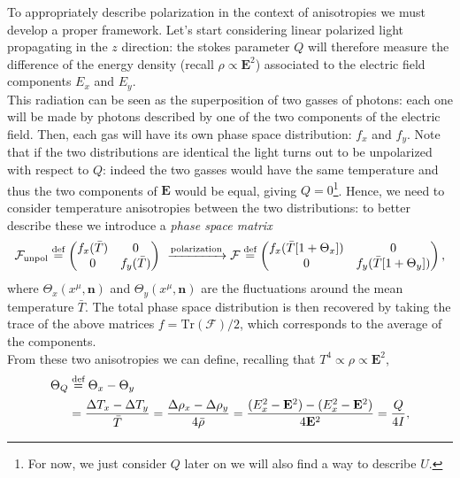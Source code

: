To appropriately describe polarization in the context of anisotropies we must develop a proper framework. Let's start considering linear polarized light propagating in the $z$ direction: the stokes parameter $Q$ will therefore measure the difference of the energy density (recall $\rho\propto \mathbf{E}^2$) associated to the electric field components $E_x$ and $E_y$.\\ This radiation can be seen as the superposition of two gasses of photons: each one will be made by photons described by one of the two components of the electric field. Then, each gas will have its own phase space distribution: $f_x$ and $f_y$. Note that if the two distributions are identical the light turns out to be unpolarized with respect to $Q$: indeed the two gasses would have the same temperature and thus the two components of $\mathbf{E}$ would be equal, giving $Q=0$\footnote{For now, we just consider $Q$ later on we will also find a way to describe $U$.}. Hence, we need to consider temperature anisotropies between the two distributions: to better describe these we introduce a \emph{phase space matrix}
\begin{equation}
    \label{eq:Pol_Occup_Matrix}
    \mathcal{F} _\text{unpol} \stackrel{\text{def}}{=}
    \begin{pmatrix}
        f_x(\bar T) & 0 \\ 0 & f_y(\bar T)
    \end{pmatrix}\ \xrightarrow{\text{polarization}}\mathcal{F}  \stackrel{\text{def}}{=}
    \begin{pmatrix}
        f_x(\bar T[1+\Theta_x]) & 0 \\ 0 & f_y(\bar T[1+\Theta_y ])
    \end{pmatrix},
\end{equation}
where $\Theta_x(x^\mu,\mathbf n)$ and $\Theta_y(x^\mu,\mathbf n)$ are the fluctuations around the mean temperature $\bar T$. The total phase space distribution is then recovered by taking the trace of the above matrices $f=\text{Tr}(\mathcal{F} )/2$, which corresponds to the average of the components.\\
From these two anisotropies we can define, recalling that $T^4\propto\rho\propto\mathbf{E}^2$,
\begin{align}
    \label{eq:ThetaQ}
    \Theta_Q&\stackrel{\text{def}}{=}\Theta_x-\Theta_y\\&=\frac{\Delta T_x-\Delta T_y}{\bar T}=\frac{\Delta\rho_x-\Delta\rho_y}{4\bar\rho}=\frac{(E_x^2-\mathbf{E}^2)-(E_x^2-\mathbf{E}^2)}{4\mathbf{E}^2}=\frac{Q}{4I},\nonumber
\end{align}
